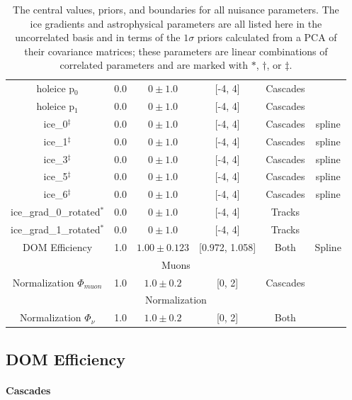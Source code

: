 \documentclass[main.tex]{subfiles}
\begin{document}
\begin{table}
\begin{tabular}{c | ccccc}
        holeice p$_{0}$ & 0.0 & $0\pm 1.0$ & [-4, 4]&Cascades & \\
        holeice p$_{1}$ & 0.0 & $0\pm 1.0$ & [-4, 4]&Cascades & \\
        ice\_0$^{\ddag}$ & 0.0 & $0\pm 1.0$ & [-4, 4]&Cascades & spline \\
        ice\_1$^{\ddag}$ & 0.0 & $0\pm 1.0$ & [-4, 4]&Cascades & spline \\
        ice\_3$^{\ddag}$ & 0.0 & $0\pm 1.0$ & [-4, 4]&Cascades & spline \\
        ice\_5$^{\ddag}$ & 0.0 & $0\pm 1.0$ & [-4, 4]&Cascades & spline \\
        ice\_6$^{\ddag}$ & 0.0 & $0\pm 1.0$ & [-4, 4]&Cascades & spline \\
        ice\_grad\_0\_rotated$^{*}$ & 0.0 & $0\pm 1.0$ & [-4, 4] & Tracks & \\
        ice\_grad\_1\_rotated$^{*}$ & 0.0 & $0\pm 1.0$ & [-4, 4]& Tracks & \\
        DOM Efficiency & 1.0 & $1.00\pm0.123$ & [0.972, 1.058] & Both & Spline \\
        \multicolumn{6}{c}{Muons} \\\hline
        Normalization $\Phi_{muon}$ & 1.0 & $1.0\pm0.2$ & [0, 2] & Cascades & \\       
        \multicolumn{6}{c}{Normalization} \\\hline
        Normalization $\Phi_{\nu}$ & 1.0 & $1.0\pm0.2$ & [0, 2] & Both & \\       
    \end{tabular}
    \caption{The central values, priors, and boundaries for all nuisance parameters. The ice gradients and astrophysical parameters are all listed here in the uncorrelated basis and in terms of the $1\sigma$ priors calculated from a PCA of their covariance matrices; these parameters are linear combinations of correlated parameters and are marked with $*$, $\dag$, or $\ddag$.}\label{table:daemon_table}
\end{table}


\subsection{DOM Efficiency}\label{subsect:domeff}

\paragraph{Cascades}
\end{document}
